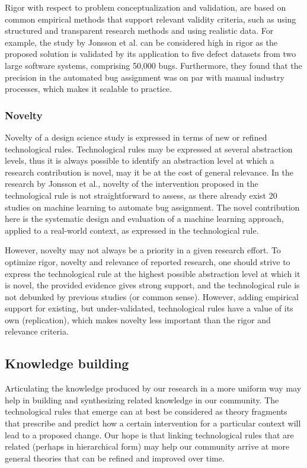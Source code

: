 \documentclass[graybox]{svmult}
\begin{document}
Rigor with respect to problem conceptualization and validation, are based on common empirical methods that support relevant validity criteria, such as using structured and transparent research methods and using realistic data. For example, the study by Jonsson et al. can be considered high in rigor as the proposed solution is validated by its application to five defect datasets from two large software systems, comprising 50,000 bugs. Furthermore, they found that the precision in the automated bug assignment was on par with manual industry processes, which makes it scalable to practice.

\subsubsection{Novelty} 
Novelty of a design science study is expressed in terms of new or refined technological rules. Technological rules may be expressed at several abstraction levels, thus it is always possible to identify an abstraction level at which a research contribution is novel, may it be at the cost of general relevance. In the research by Jonsson et al., novelty of the intervention proposed in the technological rule is not straightforward to assess, as there already exist 20 studies on machine learning to automate bug assignment. The novel contribution here is the systematic design and evaluation of a machine learning approach, applied to a real-world context, as expressed in the technological rule.

However, novelty may not always be a priority in a given research effort.
To optimize rigor, novelty and relevance of reported research, one should strive to express the technological rule at the highest possible abstraction level at which it is novel, the provided evidence gives strong support, and the technological rule is not debunked by previous studies (or common sense). However, adding empirical support for existing, but under-validated, technological rules have a value of its own (replication), which makes novelty less important than the rigor and relevance criteria.


\subsection{Knowledge building}
\label{sec:knowledge}

Articulating the knowledge produced by our research in a more uniform way may help in building and synthesizing related knowledge in our community. 
The technological rules that emerge can at best be considered as theory fragments that prescribe and predict how a certain intervention for a particular context will lead to a proposed change. 
Our hope is that linking technological rules that are related (perhaps in hierarchical form) may help our community arrive at more general theories that can be refined and improved over time.
\end{document}
